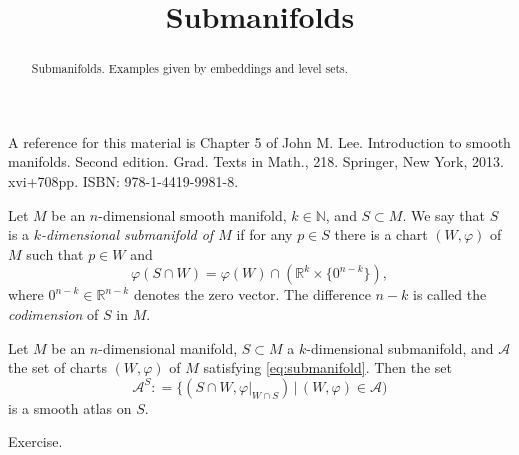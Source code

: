 \documentclass{ximera}
\title{Submanifolds}
\begin{document}
    \begin{abstract}  Submanifolds. Examples given by  embeddings and level sets.   \end{abstract}
    \maketitle

        A reference for this material is Chapter 5  of John M. Lee. Introduction to smooth manifolds. Second edition. Grad. Texts in Math., 218. Springer, New York, 2013. xvi+708pp. ISBN: 978-1-4419-9981-8.

    \begin{definition}[Submanifold]
        Let $M$ be an $n$-dimensional smooth manifold, $k \in \mathbb{N}$, and $S \subset M$. We say that $S$ is a \emph{$k$-dimensional submanifold of $M$} if for any $p \in S$ there is a chart $(W, \varphi)$ of $M$ such that  $p \in W$ and
        \begin{equation}\label{eq:submanifold}
               \varphi (S \cap W ) = \varphi (W) \cap (  \mathbb{R}^k \times \{ 0^{n-k} \} ),   
        \end{equation}
        where $0^{n-k} \in \mathbb{R}^{n-k}$ denotes the zero vector. The difference $n-k$ is called the \emph{codimension} of $S$ in $M$.
    \end{definition}

    \begin{proposition}
        Let $M$ be an $n$-dimensional manifold, $S \subset M$ a $k$-dimensional submanifold, and $\mathcal{A}$ the set of charts $(W, \varphi)$ of $M$ satisfying \eqref{eq:submanifold}. Then the set 
        \[   \mathcal{A}^S : =   \{ ( S \cap W , \varphi\vert _{W \cap S}  ) \, \vert \, (W, \varphi) \in \mathcal{A} )                                    \]
        is a smooth atlas on $S$. 
    
    \begin{solution}
        Exercise. 
    \end{solution}
\end{proposition}
\end{document}
